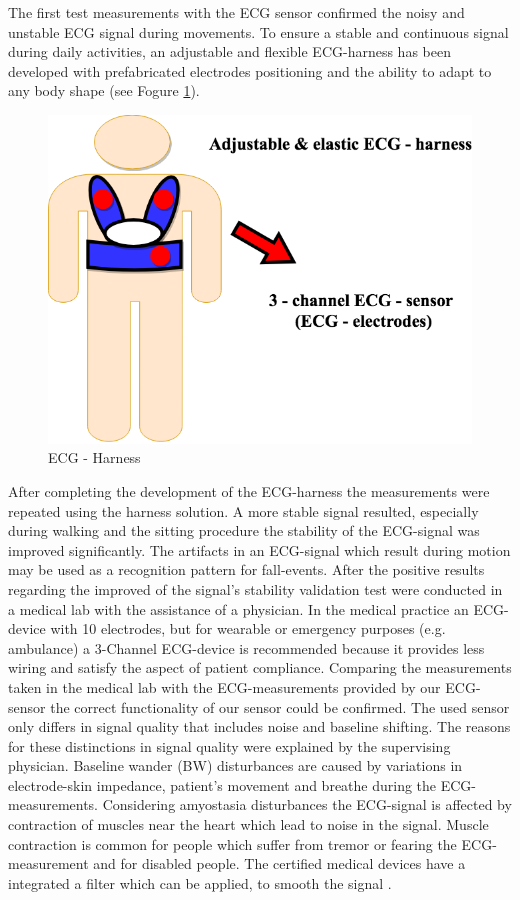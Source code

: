 \documentclass[review]{elsarticle}
\begin{document}
The first test measurements with the ECG sensor confirmed the noisy and unstable ECG signal during movements. To ensure a stable and continuous signal during daily activities, an adjustable and flexible ECG-harness has been developed with prefabricated electrodes positioning and the ability to adapt to any body shape (see Fogure \ref{fig:ECGHarness}).
\begin{figure}[!ht]
	\centering
	\includegraphics[scale=0.31]{images/ECG-Harness.png}
	\caption[ECG - Harness]{ECG - Harness}
	\label{fig:ECGHarness}
\end{figure}
After completing the development of the ECG-harness the measurements were repeated using the harness solution. A more stable signal resulted, especially during walking and the sitting procedure the stability of the ECG-signal was improved significantly. The artifacts in an ECG-signal which result during motion may be used as a recognition pattern for fall-events. After the positive results regarding the improved of the signal's stability validation test were conducted in a medical lab with the assistance of a physician. In the medical practice an ECG-device with 10 electrodes, but for wearable or emergency purposes (e.g. ambulance) a 3-Channel ECG-device is recommended because it provides less wiring and satisfy the aspect of patient compliance. Comparing the measurements taken in the medical lab with the ECG-measurements provided by our ECG-sensor the correct functionality of our sensor could be confirmed. The used sensor only differs in signal quality that includes noise and baseline shifting. The reasons for these distinctions in signal quality were explained by the supervising physician. Baseline wander (BW) disturbances are caused by variations in electrode-skin impedance, patient's movement and breathe during the ECG-measurements. Considering amyostasia disturbances the ECG-signal is affected by contraction of muscles near the heart which lead to noise in the signal. Muscle contraction is common for people which suffer from tremor or fearing the ECG-measurement and for disabled people. The certified medical devices have a integrated a filter which can be applied, to smooth the signal \cite{ECGNoise,DrNicoletteWagner}. 
\end{document}
